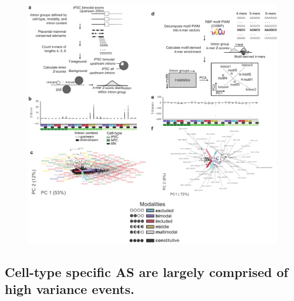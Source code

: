 \begin{figure}[h]
\ContinuedFloat
\captionsetup{labelformat=empty}
\centering
\includegraphics[width=5.8in]{figures/modality_features_supplementary_part2.pdf}
\end{figure}
\clearpage



\subsection{Cell-type specific AS are largely comprised of high variance events.}

